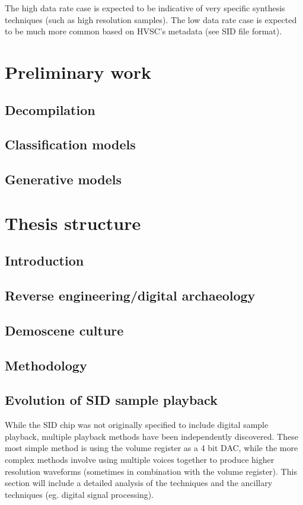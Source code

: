 \documentclass[10pt]{article}
\begin{document}
\begin{multicols*}{2}
  The high data rate case is expected to be indicative of very
  specific synthesis techniques (such as high resolution samples).
  The low data rate case is expected to be much more common based
  on HVSC's metadata (see SID file format).

  \section{Preliminary work}

  \subsection{Decompilation}

  \subsection{Classification models}

  \subsection{Generative models}

  \section{Thesis structure}

  \subsection{Introduction}

  \subsection{Reverse engineering/digital archaeology}

  \subsection{Demoscene culture}

  \subsection{Methodology}

  \subsection{Evolution of SID sample playback}
  While the SID chip was not originally specified to include digital
  sample playback, multiple playback methods have been independently
  discovered. These most simple method is using the volume register
  as a 4 bit DAC, while the more complex methods involve using
  multiple voices together to produce higher resolution waveforms
  (sometimes in combination with the volume register). This
  section will include a detailed analysis of the techniques and
  the ancillary techniques (eg. digital signal processing).


\end{multicols*}
\end{document}

